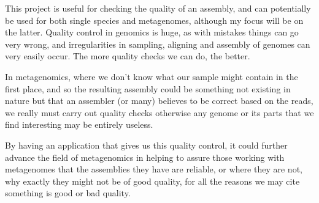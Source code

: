 \documentclass[11pt,fleqn,twoside]{article}
\begin{document}
This project is useful for checking the quality of an assembly, and can potentially be used for both single species and metagenomes, although my focus will be on the latter. Quality control in genomics is huge, as with mistakes things can go very wrong, and irregularities in sampling, aligning and assembly of genomes can very easily occur. The more quality checks we can do, the better. 

In metagenomics, where we don't know what our sample might contain in the first place, and so the resulting assembly could be something not existing in nature but that an assembler (or many) believes to be correct based on the reads, we really must carry out quality checks otherwise any genome or its parts that we find interesting may be entirely useless.

By having an application that gives us this quality control, it could further advance the field of metagenomics in helping to assure those working with metagenomes that the assemblies they have are reliable, or where they are not, why exactly they might not be of good quality, for all the reasons we may cite something is good or bad quality.

\end{document}
